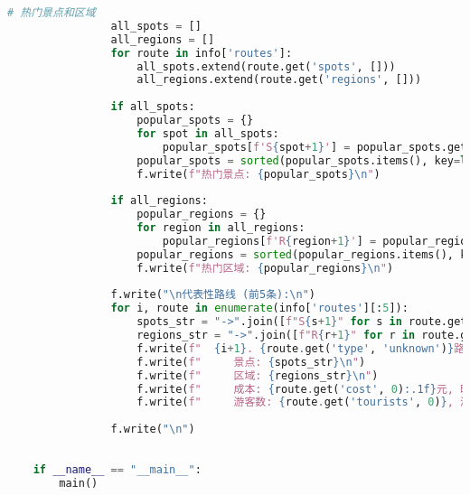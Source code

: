 \begin{lstlisting}[language=Python]
                # 热门景点和区域
                all_spots = []
                all_regions = []
                for route in info['routes']:
                    all_spots.extend(route.get('spots', []))
                    all_regions.extend(route.get('regions', []))
                
                if all_spots:
                    popular_spots = {}
                    for spot in all_spots:
                        popular_spots[f'S{spot+1}'] = popular_spots.get(f'S{spot+1}', 0) + 1
                    popular_spots = sorted(popular_spots.items(), key=lambda x: x[1], reverse=True)[:5]
                    f.write(f"热门景点: {popular_spots}\n")
                
                if all_regions:
                    popular_regions = {}
                    for region in all_regions:
                        popular_regions[f'R{region+1}'] = popular_regions.get(f'R{region+1}', 0) + 1
                    popular_regions = sorted(popular_regions.items(), key=lambda x: x[1], reverse=True)[:5]
                    f.write(f"热门区域: {popular_regions}\n")
                
                f.write("\n代表性路线 (前5条):\n")
                for i, route in enumerate(info['routes'][:5]):
                    spots_str = "->".join([f"S{s+1}" for s in route.get('spots', [])])
                    regions_str = "->".join([f"R{r+1}" for r in route.get('regions', [])])
                    f.write(f"  {i+1}. {route.get('type', 'unknown')}路线 ({route.get('config', 'unknown')}配置)\n")
                    f.write(f"     景点: {spots_str}\n")
                    f.write(f"     区域: {regions_str}\n")
                    f.write(f"     成本: {route.get('cost', 0):.1f}元, 时间: {route.get('time', 0):.1f}分钟\n")
                    f.write(f"     游客数: {route.get('tourists', 0)}, 满意度: {route.get('satisfaction', 0):.3f}\n\n")
                
                f.write("\n")
    
    
    if __name__ == "__main__":
        main()
    
\end{lstlisting}

